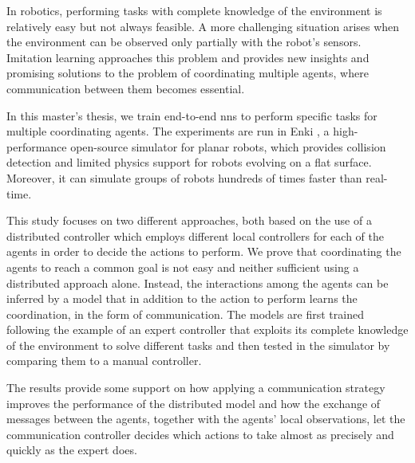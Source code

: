In robotics, performing tasks with complete knowledge of the environment is 
relatively easy but not always feasible. A more challenging situation arises 
when the environment can be observed only partially with the robot's sensors. 
Imitation learning approaches this problem and provides new insights and 
promising solutions to the problem of coordinating multiple agents, where
communication between them becomes essential.

In this master's thesis, we train end-to-end \glspl{nn} to perform specific 
tasks for multiple coordinating agents. The experiments are run in Enki 
\cite[see][]{enki}, a high-performance open-source simulator for planar robots, 
which provides collision detection and limited physics support for robots evolving 
on a flat surface. Moreover, it can simulate groups of robots hundreds of times 
faster than real-time.

This study focuses on two different approaches, both based on the use of a 
distributed controller which employs different local controllers for each of the 
agents in order to decide the actions to perform. 
We prove that coordinating the agents to reach a common goal is not easy and 
neither sufficient using a distributed approach alone. Instead, the interactions 
among the agents can be inferred by a model that in addition to the action to 
perform learns the coordination, in the form of communication. 
The models are first trained following the example of an expert controller that 
exploits its complete knowledge of the environment to solve different tasks and 
then tested in the simulator by comparing them to a manual controller.

The results provide some support on how applying a communication 
strategy improves the performance of the distributed model and how the 
exchange of messages between the agents, together with the agents' local 
observations, let the communication controller decides which actions to take 
almost as precisely and quickly as the expert does.
